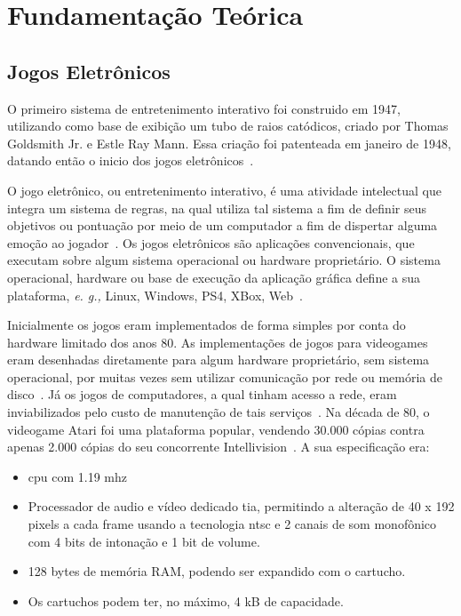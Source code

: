 \chapter{Fundamentação Teórica}
\label{cap2}



\section{Jogos Eletrônicos}



O primeiro sistema de entretenimento interativo foi construido em 1947, utilizando como base de exibição um tubo de raios catódicos, criado por Thomas Goldsmith Jr. e Estle Ray Mann.
%
Essa criação foi patenteada em janeiro de 1948, datando então o inicio dos jogos eletrônicos~\cite{Adams2014Jan, patents1947Jan}.



O jogo eletrônico, ou entretenimento interativo, é uma atividade intelectual que integra um sistema de regras, na qual utiliza tal sistema a fim de definir seus objetivos ou pontuação por meio de um computador a fim de dispertar alguma emoção ao jogador~\cite{video_game_technologies}.
%
Os jogos eletrônicos são aplicações convencionais, que executam sobre algum sistema operacional ou hardware proprietário.
%
O sistema operacional, hardware ou base de execução da aplicação gráfica define a sua plataforma, \textit{e. g.,} Linux, Windows, PS4, XBox, Web~\cite{adams_1208533}.



Inicialmente os jogos eram implementados de forma simples por conta do hardware limitado dos anos 80.
%
As implementações de jogos para videogames eram desenhadas diretamente para algum hardware proprietário, sem sistema operacional, por muitas vezes sem utilizar comunicação por rede ou memória de disco~\cite{adams_1208533}.
%
Já os jogos de computadores, a qual tinham acesso a rede, eram inviabilizados pelo custo de manutenção de tais serviços~\cite{adams_1208533}.
%
Na década de 80, o videogame Atari foi uma plataforma popular, vendendo 30.000 cópias contra apenas 2.000 cópias do seu concorrente Intellivision~\cite{atari_age}. A sua especificação era:



\begin{itemize}
  \item \ac{cpu} com 1.19 \ac{mhz}
  \item Processador de audio e vídeo dedicado \ac{tia}, permitindo a alteração de 40 x 192 pixels a cada frame usando a tecnologia \ac{ntsc} e 2 canais de som monofônico com 4 bits de intonação e 1 bit de volume.
  \item 128 bytes de memória \ac{RAM}, podendo ser expandido com o cartucho.
  \item Os cartuchos podem ter, no máximo, 4 kB de capacidade.
\end{itemize}



